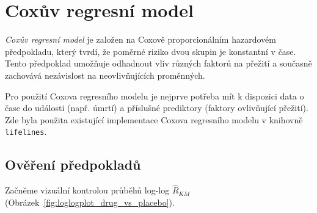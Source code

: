 \documentclass[a4, 11pt]{article}
\theoremstyle{definition}
\theoremstyle{remark}
\begin{document}
    
    
	
	\newpage
	\section{Coxův regresní model} \label{sec:cox_model}
	\textit{Coxův regresní model} je založen na Coxově proporcionálním hazardovém předpokladu, který tvrdí, že poměrné riziko dvou skupin je konstantní v čase. Tento předpoklad umožňuje odhadnout vliv různých faktorů na přežití a současně zachovává nezávislost na neovlivňujících proměnných.
	
	Pro použití Coxova regresního modelu je nejprve potřeba mít k dispozici data o čase do události (např. úmrtí) a příslušné prediktory (faktory ovlivňující přežití). Zde byla použita existující implementace Coxova regresního modelu v knihovně \texttt{lifelines}.
	
	\subsection{Ověření předpokladů}
	Začněme vizuální kontrolou průběhů log-log $ \hat{R}_{KM} $ (Obrázek~\ref{fig:loglogplot_drug_vs_placebo}).
	 
\end{document}
